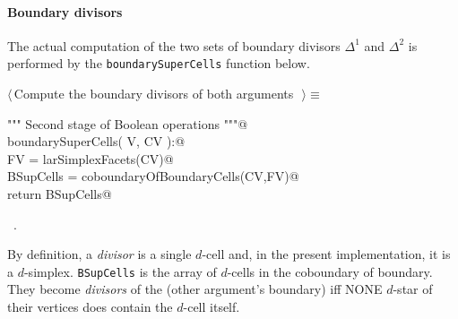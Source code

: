\documentclass[11pt,oneside]{article}	%
\begin{document}
\paragraph{Boundary divisors}
The actual computation of the two sets of boundary divisors $\Delta^1$ and $\Delta^2$ is performed by the \texttt{boundarySuperCells} function below.

\begin{flushleft} \small \label{scrap13}
$\langle\,$Compute the boundary divisors of both arguments\nobreak\ {\footnotesize {}}$\,\rangle\equiv$
\vspace{-1ex}
\begin{list}{}{} \item
\mbox{}\verb@""" Second stage of Boolean operations """@\\
\mbox{}\verb@def boundarySuperCells( V, CV ):@\\
\mbox{}\verb@   FV = larSimplexFacets(CV)@\\
\mbox{}\verb@   BSupCells = coboundaryOfBoundaryCells(CV,FV)@\\
\mbox{}\verb@   return BSupCells@\\
\mbox{}\verb@@{\NWsep}
\end{list}
\vspace{-1ex}
\footnotesize\addtolength{\baselineskip}{-1ex}
\begin{list}{}{\setlength{\itemsep}{-\parsep}\setlength{\itemindent}{-\leftmargin}}
\item \NWtxtMacroRefIn\ .
\end{list}
\end{flushleft}


By definition, a \emph{divisor} is a single $d$-cell and, in the present implementation, it is a $d$-simplex. \texttt{BSupCells} is the array of $d$-cells in the coboundary of boundary. They become \emph{divisors} of the (other argument's boundary) iff NONE $d$-star of their vertices does contain the $d$-cell itself.
\end{document}

